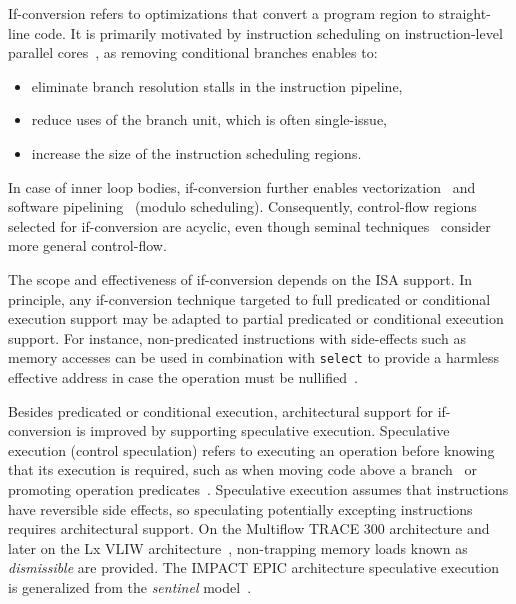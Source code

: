 If-conversion refers to optimizations that convert a program region to
straight-line code.  It is primarily motivated by instruction scheduling on
instruction-level parallel cores~\cite{Mahlke:1995:ISCA}, as removing
conditional branches enables to:
\begin{itemize}
\item eliminate branch resolution stalls in the instruction pipeline,
\item reduce uses of the branch unit, which is often single-issue,
\item increase the size of the instruction scheduling regions.
\end{itemize} In case of inner loop bodies, if-conversion further enables
vectorization~\cite{Allen:1983:POPL} and software pipelining~\cite{Park:1991:TR58}  (modulo scheduling). Consequently, control-flow regions selected for
if-conversion are acyclic, even though seminal techniques~\cite{Allen:1983:POPL,Park:1991:TR58} consider more general control-flow.

The scope and effectiveness of if-conversion depends on the ISA support.  In
principle, any if-conversion technique targeted to full predicated or
conditional execution support may be adapted to partial predicated or
conditional execution support.  For instance, non-predicated instructions with
side-effects such as memory accesses can be used in combination with \texttt{select} to
provide a harmless effective address in case the operation must be nullified~\cite{Mahlke:1995:ISCA}.

Besides predicated or conditional execution, architectural support for
if-conversion is improved by supporting speculative execution. Speculative
execution (control speculation) refers to executing an operation before knowing
that its execution is required, such as when moving code above a branch~\cite{Lowney:1993:JS} or promoting operation predicates~\cite{Mahlke:1995:ISCA}.
Speculative execution assumes that instructions have reversible side effects, so
speculating potentially excepting instructions requires architectural support.
On the Multiflow TRACE 300 architecture and later on the Lx VLIW architecture~\cite{Faraboschi:2000:ISCA}, non-trapping memory loads known as
\emph{dismissible} are provided. The IMPACT EPIC architecture speculative
execution~\cite{August:1998:ISCA} is generalized from the \emph{sentinel} model~\cite{Mahlke:1992:ASPLOS}.

